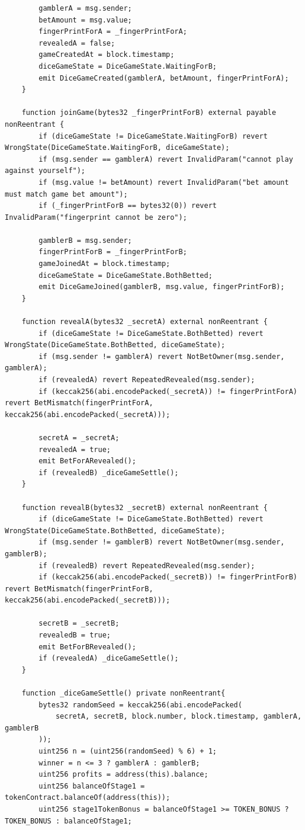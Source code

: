 \documentclass[10pt,a4paper]{article}
\begin{document}
\begin{lstlisting}
        gamblerA = msg.sender;
        betAmount = msg.value;
        fingerPrintForA = _fingerPrintForA;
        revealedA = false;
        gameCreatedAt = block.timestamp;
        diceGameState = DiceGameState.WaitingForB;
        emit DiceGameCreated(gamblerA, betAmount, fingerPrintForA);
    }

    function joinGame(bytes32 _fingerPrintForB) external payable nonReentrant {
        if (diceGameState != DiceGameState.WaitingForB) revert WrongState(DiceGameState.WaitingForB, diceGameState);
        if (msg.sender == gamblerA) revert InvalidParam("cannot play against yourself");
        if (msg.value != betAmount) revert InvalidParam("bet amount must match game bet amount");
        if (_fingerPrintForB == bytes32(0)) revert InvalidParam("fingerprint cannot be zero");
      
        gamblerB = msg.sender;
        fingerPrintForB = _fingerPrintForB;
        gameJoinedAt = block.timestamp;
        diceGameState = DiceGameState.BothBetted;
        emit DiceGameJoined(gamblerB, msg.value, fingerPrintForB);
    }

    function revealA(bytes32 _secretA) external nonReentrant {
        if (diceGameState != DiceGameState.BothBetted) revert WrongState(DiceGameState.BothBetted, diceGameState);
        if (msg.sender != gamblerA) revert NotBetOwner(msg.sender, gamblerA);
        if (revealedA) revert RepeatedRevealed(msg.sender);
        if (keccak256(abi.encodePacked(_secretA)) != fingerPrintForA) revert BetMismatch(fingerPrintForA, keccak256(abi.encodePacked(_secretA)));
     
        secretA = _secretA;
        revealedA = true;
        emit BetForARevealed();
        if (revealedB) _diceGameSettle(); 
    }

    function revealB(bytes32 _secretB) external nonReentrant {
        if (diceGameState != DiceGameState.BothBetted) revert WrongState(DiceGameState.BothBetted, diceGameState);
        if (msg.sender != gamblerB) revert NotBetOwner(msg.sender, gamblerB);
        if (revealedB) revert RepeatedRevealed(msg.sender);
        if (keccak256(abi.encodePacked(_secretB)) != fingerPrintForB) revert BetMismatch(fingerPrintForB, keccak256(abi.encodePacked(_secretB)));
     
        secretB = _secretB;
        revealedB = true;
        emit BetForBRevealed();
        if (revealedA) _diceGameSettle(); 
    }

    function _diceGameSettle() private nonReentrant{
        bytes32 randomSeed = keccak256(abi.encodePacked(
            secretA, secretB, block.number, block.timestamp, gamblerA, gamblerB
        ));
        uint256 n = (uint256(randomSeed) % 6) + 1;
        winner = n <= 3 ? gamblerA : gamblerB;
        uint256 profits = address(this).balance;
        uint256 balanceOfStage1 = tokenContract.balanceOf(address(this));
        uint256 stage1TokenBonus = balanceOfStage1 >= TOKEN_BONUS ? TOKEN_BONUS : balanceOfStage1;


\end{lstlisting}
\end{document}
